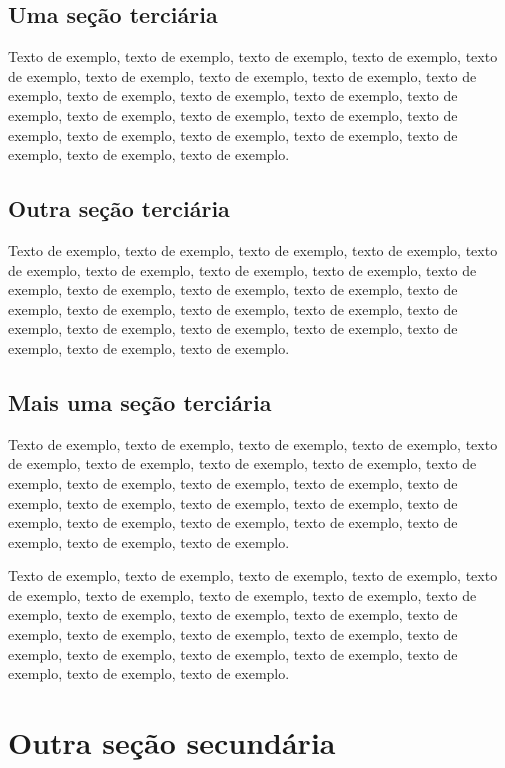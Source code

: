 \documentclass[
	12pt,				%
	oneside,			%
	a4paper,			%
	english,			%
	brazil				%
	]{abntex2ppgsi}
\begin{document}
\subsection{Uma seção terciária}

Texto de exemplo, texto de exemplo, texto de exemplo, texto de exemplo, texto de exemplo, texto de exemplo, texto de exemplo, texto de exemplo, texto de exemplo, texto de exemplo, texto de exemplo, texto de exemplo, texto de exemplo, texto de exemplo, texto de exemplo, texto de exemplo, texto de exemplo, texto de exemplo, texto de exemplo, texto de exemplo, texto de exemplo, texto de exemplo, texto de exemplo.


\subsection{Outra seção terciária}

Texto de exemplo, texto de exemplo, texto de exemplo, texto de exemplo, texto de exemplo, texto de exemplo, texto de exemplo, texto de exemplo, texto de exemplo, texto de exemplo, texto de exemplo, texto de exemplo, texto de exemplo, texto de exemplo, texto de exemplo, texto de exemplo, texto de exemplo, texto de exemplo, texto de exemplo, texto de exemplo, texto de exemplo, texto de exemplo, texto de exemplo.

\subsection{Mais uma seção terciária}

Texto de exemplo, texto de exemplo, texto de exemplo, texto de exemplo, texto de exemplo, texto de exemplo, texto de exemplo, texto de exemplo, texto de exemplo, texto de exemplo, texto de exemplo, texto de exemplo, texto de exemplo, texto de exemplo, texto de exemplo, texto de exemplo, texto de exemplo, texto de exemplo, texto de exemplo, texto de exemplo, texto de exemplo, texto de exemplo, texto de exemplo.

Texto de exemplo, texto de exemplo, texto de exemplo, texto de exemplo, texto de exemplo, texto de exemplo, texto de exemplo, texto de exemplo, texto de exemplo, texto de exemplo, texto de exemplo, texto de exemplo, texto de exemplo, texto de exemplo, texto de exemplo, texto de exemplo, texto de exemplo, texto de exemplo, texto de exemplo, texto de exemplo, texto de exemplo, texto de exemplo, texto de exemplo.

\section{Outra seção secundária}
\end{document}
